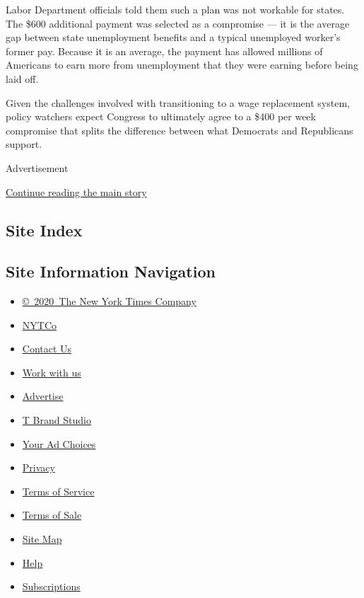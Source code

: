 Labor Department officials told them such a plan was not workable for
states. The \$600 additional payment was selected as a compromise --- it
is the average gap between state unemployment benefits and a typical
unemployed worker's former pay. Because it is an average, the payment
has allowed millions of Americans to earn more from unemployment that
they were earning before being laid off.

Given the challenges involved with transitioning to a wage replacement
system, policy watchers expect Congress to ultimately agree to a \$400
per week compromise that splits the difference between what Democrats
and Republicans support.

Advertisement

\protect\hyperlink{after-bottom}{Continue reading the main story}

\hypertarget{site-index}{%
\subsection{Site Index}\label{site-index}}

\hypertarget{site-information-navigation}{%
\subsection{Site Information
Navigation}\label{site-information-navigation}}

\begin{itemize}
\tightlist
\item
  \href{https://help.nytimes3xbfgragh.onion/hc/en-us/articles/115014792127-Copyright-notice}{©~2020~The
  New York Times Company}
\end{itemize}

\begin{itemize}
\tightlist
\item
  \href{https://www.nytco.com/}{NYTCo}
\item
  \href{https://help.nytimes3xbfgragh.onion/hc/en-us/articles/115015385887-Contact-Us}{Contact
  Us}
\item
  \href{https://www.nytco.com/careers/}{Work with us}
\item
  \href{https://nytmediakit.com/}{Advertise}
\item
  \href{http://www.tbrandstudio.com/}{T Brand Studio}
\item
  \href{https://www.nytimes3xbfgragh.onion/privacy/cookie-policy\#how-do-i-manage-trackers}{Your
  Ad Choices}
\item
  \href{https://www.nytimes3xbfgragh.onion/privacy}{Privacy}
\item
  \href{https://help.nytimes3xbfgragh.onion/hc/en-us/articles/115014893428-Terms-of-service}{Terms
  of Service}
\item
  \href{https://help.nytimes3xbfgragh.onion/hc/en-us/articles/115014893968-Terms-of-sale}{Terms
  of Sale}
\item
  \href{https://spiderbites.nytimes3xbfgragh.onion}{Site Map}
\item
  \href{https://help.nytimes3xbfgragh.onion/hc/en-us}{Help}
\item
  \href{https://www.nytimes3xbfgragh.onion/subscription?campaignId=37WXW}{Subscriptions}
\end{itemize}
